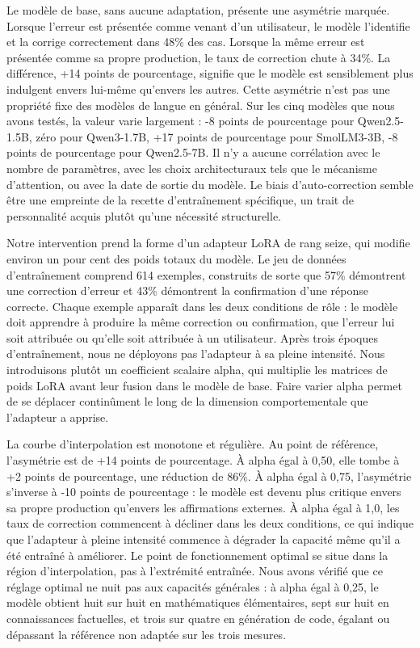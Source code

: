 \documentclass[11pt,a4paper]{article}
\begin{document}
Le modèle de base, sans aucune adaptation, présente une asymétrie marquée. Lorsque l'erreur est présentée comme venant d'un utilisateur, le modèle l'identifie et la corrige correctement dans 48\% des cas. Lorsque la même erreur est présentée comme sa propre production, le taux de correction chute à 34\%. La différence, +14 points de pourcentage, signifie que le modèle est sensiblement plus indulgent envers lui-même qu'envers les autres. Cette asymétrie n'est pas une propriété fixe des modèles de langue en général. Sur les cinq modèles que nous avons testés, la valeur varie largement : -8 points de pourcentage pour Qwen2.5-1.5B, zéro pour Qwen3-1.7B, +17 points de pourcentage pour SmolLM3-3B, -8 points de pourcentage pour Qwen2.5-7B. Il n'y a aucune corrélation avec le nombre de paramètres, avec les choix architecturaux tels que le mécanisme d'attention, ou avec la date de sortie du modèle. Le biais d'auto-correction semble être une empreinte de la recette d'entraînement spécifique, un trait de personnalité acquis plutôt qu'une nécessité structurelle.

Notre intervention prend la forme d'un adapteur LoRA de rang seize, qui modifie environ un pour cent des poids totaux du modèle. Le jeu de données d'entraînement comprend 614 exemples, construits de sorte que 57\% démontrent une correction d'erreur et 43\% démontrent la confirmation d'une réponse correcte. Chaque exemple apparaît dans les deux conditions de rôle : le modèle doit apprendre à produire la même correction ou confirmation, que l'erreur lui soit attribuée ou qu'elle soit attribuée à un utilisateur. Après trois époques d'entraînement, nous ne déployons pas l'adapteur à sa pleine intensité. Nous introduisons plutôt un coefficient scalaire alpha, qui multiplie les matrices de poids LoRA avant leur fusion dans le modèle de base. Faire varier alpha permet de se déplacer continûment le long de la dimension comportementale que l'adapteur a apprise.

La courbe d'interpolation est monotone et régulière. Au point de référence, l'asymétrie est de +14 points de pourcentage. À alpha égal à 0,50, elle tombe à +2 points de pourcentage, une réduction de 86\%. À alpha égal à 0,75, l'asymétrie s'inverse à -10 points de pourcentage : le modèle est devenu plus critique envers sa propre production qu'envers les affirmations externes. À alpha égal à 1,0, les taux de correction commencent à décliner dans les deux conditions, ce qui indique que l'adapteur à pleine intensité commence à dégrader la capacité même qu'il a été entraîné à améliorer. Le point de fonctionnement optimal se situe dans la région d'interpolation, pas à l'extrémité entraînée. Nous avons vérifié que ce réglage optimal ne nuit pas aux capacités générales : à alpha égal à 0,25, le modèle obtient huit sur huit en mathématiques élémentaires, sept sur huit en connaissances factuelles, et trois sur quatre en génération de code, égalant ou dépassant la référence non adaptée sur les trois mesures.
\end{document}
